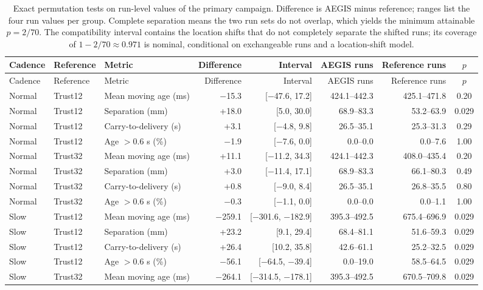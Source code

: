 {\footnotesize\setlength{\tabcolsep}{3.5pt}
\begin{longtable}{@{}lllrrrrc@{}}
\caption{Exact permutation tests on run-level values of the primary campaign. Difference is AEGIS minus reference; ranges list the four run values per group. Complete separation means the two run sets do not overlap, which yields the minimum attainable $p=2/70$. The compatibility interval contains the location shifts that do not completely separate the shifted runs; its coverage of $1-2/70\approx0.971$ is nominal, conditional on exchangeable runs and a location-shift model.}\label{tab:exact-full}\\
\toprule Cadence&Reference&Metric&Difference&Interval&AEGIS runs&Reference runs&$p$\\ \midrule\endfirsthead
\toprule Cadence&Reference&Metric&Difference&Interval&AEGIS runs&Reference runs&$p$\\ \midrule\endhead
Normal&Trust12&Mean moving age (ms)&$-$15.3&[$-$47.6, 17.2]&424.1--442.3&425.1--471.8&0.20\\
Normal&Trust12&Separation (mm)&+18.0&[5.0, 30.0]&68.9--83.3&53.2--63.9&0.029\\
Normal&Trust12&Carry-to-delivery (s)&+3.1&[$-$4.8, 9.8]&26.5--35.1&25.3--31.3&0.29\\
Normal&Trust12&Age $>0.6$ s (\%)&$-$1.9&[$-$7.6, 0.0]&0.0--0.0&0.0--7.6&1.00\\
Normal&Trust32&Mean moving age (ms)&+11.1&[$-$11.2, 34.3]&424.1--442.3&408.0--435.4&0.20\\
Normal&Trust32&Separation (mm)&+3.0&[$-$11.4, 17.1]&68.9--83.3&66.1--80.3&0.49\\
Normal&Trust32&Carry-to-delivery (s)&+0.8&[$-$9.0, 8.4]&26.5--35.1&26.8--35.5&0.80\\
Normal&Trust32&Age $>0.6$ s (\%)&$-$0.3&[$-$1.1, 0.0]&0.0--0.0&0.0--1.1&1.00\\
Slow&Trust12&Mean moving age (ms)&$-$259.1&[$-$301.6, $-$182.9]&395.3--492.5&675.4--696.9&0.029\\
Slow&Trust12&Separation (mm)&+23.2&[9.1, 29.4]&68.4--81.1&51.6--59.3&0.029\\
Slow&Trust12&Carry-to-delivery (s)&+26.4&[10.2, 35.8]&42.6--61.1&25.2--32.5&0.029\\
Slow&Trust12&Age $>0.6$ s (\%)&$-$56.1&[$-$64.5, $-$39.4]&0.0--19.0&58.5--64.5&0.029\\
Slow&Trust32&Mean moving age (ms)&$-$264.1&[$-$314.5, $-$178.1]&395.3--492.5&670.5--709.8&0.029\\

\end{longtable}}
